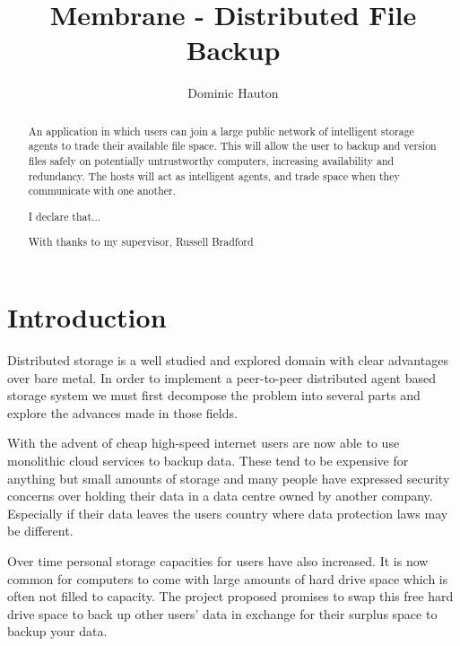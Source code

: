 \documentclass[a4paper, 11pt, twocolumn, twoside]{report}
\title{Membrane - Distributed File Backup}
\author{Dominic Hauton}
\begin{document}
\maketitle


\begin{abstract}
An application in which users can join a large public network of intelligent storage agents to trade their available file space. This will allow the user to backup and version files safely on potentially untrustworthy computers, increasing availability and redundancy. The hosts will act as intelligent agents, and trade space when they communicate with one another.
\end{abstract}

\renewcommand{\abstractname}{Declaration}
\begin{abstract}
\hfil I declare that... \hfil
\end{abstract}

\renewcommand{\abstractname}{Acknowledgements}
\begin{abstract}
\hfil With thanks to my supervisor, Russell Bradford \hfil
\end{abstract}

\tableofcontents

\chapter{Introduction}
Distributed storage is a well studied and explored domain with clear advantages over bare metal. In order to implement a peer-to-peer distributed agent based storage system we must first decompose the problem into several parts and explore the advances made in those fields.

With the advent of cheap high-speed internet users are now able to use monolithic cloud services to backup data. These tend to be expensive for anything but small amounts of storage and many people have expressed security concerns over holding their data in a data centre owned by another company. Especially if their data leaves the users country where data protection laws may be different.

Over time personal storage capacities for users have also increased. It is now common for computers to come with large amounts of hard drive space which is often not filled to capacity. The project proposed promises to swap this free hard drive space to back up other users’ data in exchange for their surplus space to backup your data.
\end{document}
